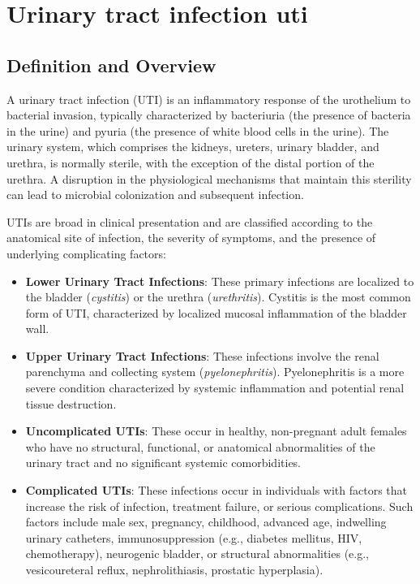 \chapter{Urinary tract infection uti}

\section*{Definition and Overview}
A urinary tract infection (UTI) is an inflammatory response of the urothelium to bacterial invasion, typically characterized by bacteriuria (the presence of bacteria in the urine) and pyuria (the presence of white blood cells in the urine). The urinary system, which comprises the kidneys, ureters, urinary bladder, and urethra, is normally sterile, with the exception of the distal portion of the urethra. A disruption in the physiological mechanisms that maintain this sterility can lead to microbial colonization and subsequent infection.

UTIs are broad in clinical presentation and are classified according to the anatomical site of infection, the severity of symptoms, and the presence of underlying complicating factors:
\begin{itemize}
    \item \textbf{Lower Urinary Tract Infections}: These primary infections are localized to the bladder (\textit{cystitis}) or the urethra (\textit{urethritis}). Cystitis is the most common form of UTI, characterized by localized mucosal inflammation of the bladder wall.
    \item \textbf{Upper Urinary Tract Infections}: These infections involve the renal parenchyma and collecting system (\textit{pyelonephritis}). Pyelonephritis is a more severe condition characterized by systemic inflammation and potential renal tissue destruction.
    \item \textbf{Uncomplicated UTIs}: These occur in healthy, non-pregnant adult females who have no structural, functional, or anatomical abnormalities of the urinary tract and no significant systemic comorbidities.
    \item \textbf{Complicated UTIs}: These infections occur in individuals with factors that increase the risk of infection, treatment failure, or serious complications. Such factors include male sex, pregnancy, childhood, advanced age, indwelling urinary catheters, immunosuppression (e.g., diabetes mellitus, HIV, chemotherapy), neurogenic bladder, or structural abnormalities (e.g., vesicoureteral reflux, nephrolithiasis, prostatic hyperplasia).
\end{itemize}

